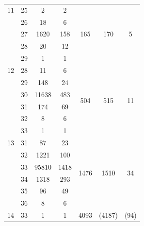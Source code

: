 \begin{table}[htbp]
{\begin{threeparttable}[para]
\begin{tabular}{clccccc}
    11 & 25  & 2      				& 2    & \multirow{5}{*}{165}  & \multirow{5}{*}{170}  & \multirow{5}{*}{5}  \\
       & 26  & 18     				& 6    &                       &                       &                     \\
            & 27  & 1620\tnote{a}	& 158  &                       &                       &                     \\
       & 28  & 20     				& 12   &                       &                       &                     \\
       & 29  & 1      				& 1    &                       &                       &                     \\  \midrule
    12 & 28  & 11     				& 6    & \multirow{6}{*}{504}  & \multirow{6}{*}{515}  & \multirow{6}{*}{11} \\
       & 29  & 148    				& 24   &                       &                       &                     \\
       & 30  & 11638  				& 483  &                       &                       &                     \\
       & 31  & 174    				& 69   &                       &                       &                     \\
       & 32  & 8      				& 6    &                       &                       &                     \\
       & 33  & 1      				& 1    &                       &                       &                     \\  \midrule
    13 & 31  & 87     				& 23   & \multirow{6}{*}{1476} & \multirow{6}{*}{1510} & \multirow{6}{*}{34} \\
       & 32  & 1221   				& 100  &                       &                       &                     \\
            & 33  & 95810\tnote{a}& 1418 &                       &                       &                     \\
            & 34  & 1318\tnote{a} & 293  &                       &                       &                     \\
       & 35  & 96     				& 49   &                       &                       &                     \\
       & 36  & 8      				& 6    &                       &                       &                     \\  \midrule
            14 & 33  & 1      				& 1    & \multirow{8}{*}{4093} & \multirow{8}{*}{(4187)\tnote{b}}    & \multirow{8}{*}{(94)\tnote{b}}  \\

\end{tabular}
\end{threeparttable}}
\end{table}
